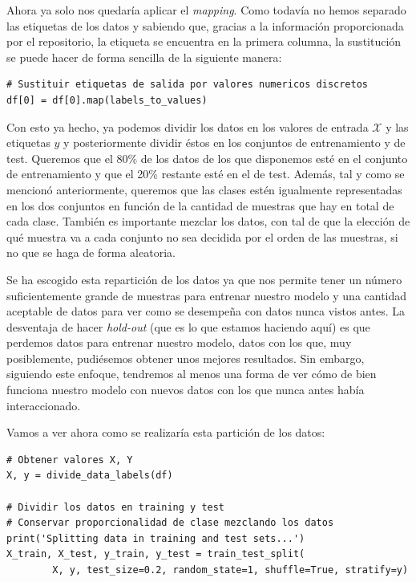 \documentclass[11pt,a4paper]{article}
\begin{document}
Ahora ya solo nos quedaría aplicar el \textit{mapping}. Como todavía no hemos separado las etiquetas de los datos y sabiendo que, gracias
a la información proporcionada por el repositorio, la etiqueta se encuentra en la primera columna, la sustitución se puede hacer de forma
sencilla de la siguiente manera:

\begin{lstlisting}
# Sustituir etiquetas de salida por valores numericos discretos
df[0] = df[0].map(labels_to_values)
\end{lstlisting}

Con esto ya hecho, ya podemos dividir los datos en los valores de entrada $\mathcal{X}$ y las etiquetas $y$ y posteriormente dividir
éstos en los conjuntos de entrenamiento y de test. Queremos que el 80\% de los datos de los que disponemos esté en el conjunto de
entrenamiento y que el 20\% restante esté en el de test. Además, tal y como se mencionó anteriormente, queremos que las clases estén
igualmente representadas en los dos conjuntos en función de la cantidad de muestras que hay en total de cada clase. También es importante
mezclar los datos, con tal de que la elección de qué muestra va a cada conjunto no sea decidida por el orden de las muestras, si
no que se haga de forma aleatoria.

Se ha escogido esta repartición de los datos ya que nos permite tener un número suficientemente grande de muestras para entrenar nuestro
modelo y una cantidad aceptable de datos para ver como se desempeña con datos nunca vistos antes. La desventaja de hacer \textit{hold-out}
(que es lo que estamos haciendo aquí) es que perdemos datos para entrenar nuestro modelo, datos con los que, muy posiblemente, pudiésemos
obtener unos mejores resultados. Sin embargo, siguiendo este enfoque, tendremos al menos una forma de ver cómo de bien funciona nuestro
modelo con nuevos datos con los que nunca antes había interaccionado.

Vamos a ver ahora como se realizaría esta partición de los datos:

\begin{lstlisting}
# Obtener valores X, Y
X, y = divide_data_labels(df)

# Dividir los datos en training y test
# Conservar proporcionalidad de clase mezclando los datos
print('Splitting data in training and test sets...')
X_train, X_test, y_train, y_test = train_test_split(
        X, y, test_size=0.2, random_state=1, shuffle=True, stratify=y)
\end{lstlisting}
\end{document}
